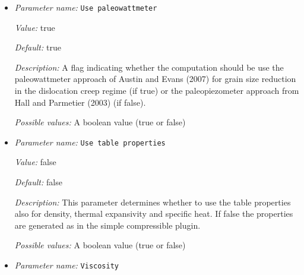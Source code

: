 \begin{itemize}
{\it Value:} true


{\it Default:} true


{\it Description:} This parameter determines whether to use the enthalpy to calculate the thermal expansivity and specific heat (if true) or use the thermal expansivity and specific heat values from the material properties table directly (if false).


{\it Possible values:} A boolean value (true or false)
\item {\it Parameter name:} {\tt Use paleowattmeter}
\label{parameters:Material model/Grain size model/Use paleowattmeter}
\label{parameters:Material_20model/Grain_20size_20model/Use_20paleowattmeter}


{\it Value:} true


{\it Default:} true


{\it Description:} A flag indicating whether the computation should be use the paleowattmeter approach of Austin and Evans (2007) for grain size reduction in the dislocation creep regime (if true) or the paleopiezometer approach from Hall and Parmetier (2003) (if false).


{\it Possible values:} A boolean value (true or false)
\item {\it Parameter name:} {\tt Use table properties}
\label{parameters:Material model/Grain size model/Use table properties}
\label{parameters:Material_20model/Grain_20size_20model/Use_20table_20properties}


{\it Value:} false


{\it Default:} false


{\it Description:} This parameter determines whether to use the table properties also for density, thermal expansivity and specific heat. If false the properties are generated as in the simple compressible plugin.


{\it Possible values:} A boolean value (true or false)
\item {\it Parameter name:} {\tt Viscosity}
\label{parameters:Material model/Grain size model/Viscosity}
\label{parameters:Material_20model/Grain_20size_20model/Viscosity}



\end{itemize}
